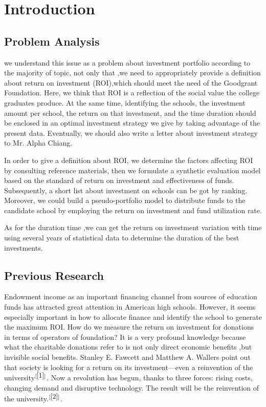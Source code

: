 \documentclass{mcmthesis}
\begin{document}
\newpage
\newpage









\section{Introduction}
\subsection{Problem Analysis}
we understand this issue as a problem about investment portfolio according to the majority of topic, not only that ,we need to appropriately provide a definition about return on investment (ROI),which should meet the need of the Goodgrant Foundation. Here, we think that ROI is a reflection of the social value the college graduates produce. At the same time, identifying the schools, the investment amount per school, the return on that investment, and the time duration should be enclosed in an optimal investment strategy we give by taking advantage of the present data. Eventually, we should also write a letter about investment strategy to Mr. Alpha Chiang.\par

In order to give a definition about ROI, we determine the factors affecting ROI by consulting reference materials, then we formulate a synthetic evaluation model based on the standard of return on investment and effectiveness of funds. Subsequently, a short list about investment on schools can be got by ranking. Moreover, we could build a pseudo-portfolio model to distribute funds to the candidate school by employing the return on investment and fund utilization rate.\par

As for the duration time ,we can get the return on investment variation with time using several years of statistical data to determine the duration of the best investments.\par

\subsection{Previous Research}
Endowment income as an important financing channel from sources of education funds has attracted great attention in American high schools. However, it seems especially important in how to allocate finance and identify the school to generate the maximum ROI. How do we measure the return on investment for donations in terms of operators of foundation? It is a very profound knowledge because what the charitable donations refer to is not only direct economic benefits ,but invisible social benefits. Stanley E. Fawcett and Matthew A. Wallers point out that society is looking for a return on its investment—even a reinvention of the university$^{[\ref{1}]}$. Now a revolution has begun, thanks to three forces: rising costs, changing demand and disruptive technology. The result will be the reinvention of the university.$^{[\ref{2}]}$.\par
\end{document}
